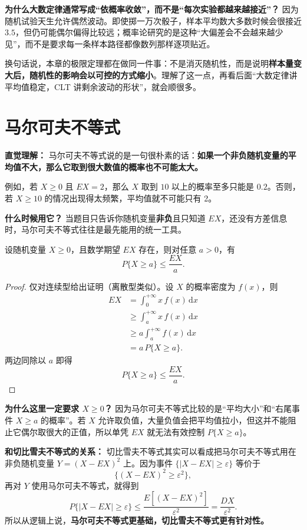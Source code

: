 ﻿\documentclass[lang=cn,11pt]{elegantbook}
\begin{document}
\begin{note}
\textbf{为什么大数定律通常写成“依概率收敛”，而不是“每次实验都越来越接近”？} 因为随机试验天生允许偶然波动。即使掷一万次骰子，样本平均数大多数时候会很接近 \(3.5\)，但仍可能偶尔偏得比较远；概率论研究的是这种“大偏差会不会越来越少见”，而不是要求每一条样本路径都像数列那样逐项贴近。

换句话说，本章的极限定理都在做同一件事：不是消灭随机性，而是说明\textbf{样本量变大后，随机性的影响会以可控的方式缩小}。理解了这一点，再看后面“大数定律讲平均值稳定，CLT 讲剩余波动的形状”，就会顺很多。
\end{note}


\section{马尔可夫不等式}

\begin{note}
\textbf{直觉理解：} 马尔可夫不等式说的是一句很朴素的话：\textbf{如果一个非负随机变量的平均值不大，那么它取到很大数值的概率也不可能太大。}

例如，若 \(X\ge 0\) 且 \(EX=2\)，那么 \(X\) 取到 \(10\) 以上的概率至多只能是 \(0.2\)。否则，若 \(X\ge10\) 的情况出现得太频繁，平均值就不可能只有 2。

\textbf{什么时候用它？} 当题目只告诉你随机变量\textbf{非负}且只知道 \(EX\)，还没有方差信息时，马尔可夫不等式往往是最先能用的统一工具。
\end{note}

\begin{theorem}[马尔可夫不等式] \label{thm:markov}
设随机变量 \(X\ge 0\)，且数学期望 \(EX\) 存在，则对任意 \(a>0\)，有
\[
P\{X\ge a\}\le \frac{EX}{a}.
\]
\end{theorem}
\begin{proof}
仅对连续型给出证明（离散型类似）。设 \(X\) 的概率密度为 \(f(x)\)，则
\begin{align*}
EX &= \int_0^{+\infty}x\,f(x)\,\mathrm{d}x \\
&\ge \int_a^{+\infty}x\,f(x)\,\mathrm{d}x \\
&\ge a\int_a^{+\infty}f(x)\,\mathrm{d}x \\
&= a\,P\{X\ge a\}.
\end{align*}
两边同除以 \(a\) 即得
\[
P\{X\ge a\}\le \frac{EX}{a}.
\]
\end{proof}

\begin{note}
\textbf{为什么这里一定要求 \(X\ge 0\)？} 因为马尔可夫不等式比较的是“平均大小”和“右尾事件 \(X\ge a\) 的概率”。若 \(X\) 允许取负值，大量负值会把平均值拉小，但这并不能阻止它偶尔取很大的正值，所以单凭 \(EX\) 就无法有效控制 \(P\{X\ge a\}\)。

\textbf{和切比雪夫不等式的关系：} 切比雪夫不等式其实可以看成把马尔可夫不等式用在非负随机变量 \(Y=(X-EX)^2\) 上。因为事件 \(\{|X-EX|\ge \varepsilon\}\) 等价于
\[
\{(X-EX)^2\ge \varepsilon^2\},
\]
再对 \(Y\) 使用马尔可夫不等式，就得到
\[
P\{|X-EX|\ge \varepsilon\}\le \frac{E[(X-EX)^2]}{\varepsilon^2}=\frac{DX}{\varepsilon^2}.
\]
所以从逻辑上说，\textbf{马尔可夫不等式更基础，切比雪夫不等式更有针对性。}
\end{note}
\end{document}
